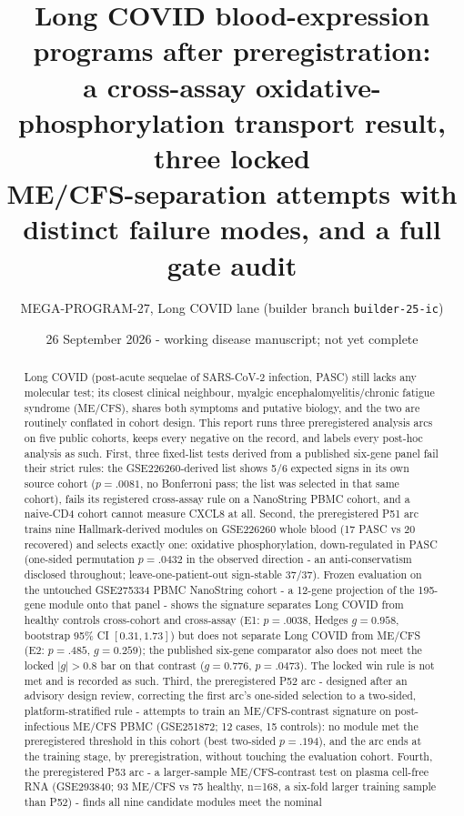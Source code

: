 \documentclass[11pt,a4paper]{article}
\title{Long COVID blood-expression programs after preregistration:\\
a cross-assay oxidative-phosphorylation transport result, three locked\\
ME/CFS-separation attempts with distinct failure modes, and a full gate audit}
\author{MEGA-PROGRAM-27, Long COVID lane (builder branch \texttt{builder-25-ic})}
\date{26 September 2026 - working disease manuscript; not yet complete}
\begin{document}
\maketitle
\begin{abstract}
Long COVID (post-acute sequelae of SARS-CoV-2 infection, PASC) still lacks any
molecular test; its closest clinical neighbour, myalgic encephalomyelitis/chronic
fatigue syndrome (ME/CFS), shares both symptoms and putative biology, and the two
are routinely conflated in cohort design. This report runs three preregistered
analysis arcs on five public cohorts, keeps every negative on the record, and
labels every post-hoc analysis as such. First, three fixed-list tests derived
from a published six-gene panel fail their strict rules: the GSE226260-derived
list shows 5/6 expected signs in its own source cohort ($p=.0081$, no
Bonferroni pass; the list was selected in that same cohort), fails its
registered cross-assay rule on a NanoString PBMC cohort, and a naive-CD4
cohort cannot measure CXCL8 at all. Second, the preregistered P51 arc trains
nine Hallmark-derived modules on GSE226260 whole blood (17 PASC vs 20
recovered) and selects exactly one: oxidative phosphorylation, down-regulated
in PASC (one-sided permutation $p=.0432$ in the observed direction - an
anti-conservatism disclosed throughout; leave-one-patient-out sign-stable
37/37). Frozen evaluation on the untouched GSE275334 PBMC NanoString cohort -
a 12-gene projection of the 195-gene module onto that panel - shows the
signature separates Long COVID from healthy controls cross-cohort and
cross-assay (E1: $p=.0038$, Hedges $g=0.958$, bootstrap 95\% CI
$[0.31, 1.73]$) but does not separate Long COVID from ME/CFS (E2: $p=.485$,
$g=0.259$); the published six-gene comparator also does not meet the locked
$|g|>0.8$ bar on that contrast ($g=0.776$, $p=.0473$). The locked win rule is
not met and is recorded as such. Third, the preregistered P52 arc - designed
after an advisory design review, correcting the first arc's one-sided
selection to a two-sided, platform-stratified rule - attempts to train an
ME/CFS-contrast signature on post-infectious ME/CFS PBMC (GSE251872; 12
cases, 15 controls): no module met the preregistered threshold in this cohort
(best two-sided $p=.194$), and the arc ends at the training stage, by
preregistration, without touching the evaluation cohort. Fourth, the
preregistered P53 arc - a larger-sample ME/CFS-contrast test on plasma
cell-free RNA (GSE293840; 93 ME/CFS vs 75 healthy, n=168, a six-fold larger
training sample than P52) - finds all nine candidate modules meet the nominal

\end{abstract}
\end{document}
